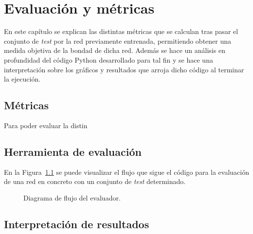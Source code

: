 \chapter{Evaluación y métricas}\label{cap.evaluacion}

En este capítulo se explican las distintas métricas que se calculan tras pasar el conjunto de \textit{test} por la red previamente entrenada, permitiendo obtener una medida objetiva de la bondad de dicha red. Además se hace un análisis en profundidad del código Python desarrollado para tal fin y se hace una interpretación sobre los gráficos y resultados que arroja dicho código al terminar la ejecución.

\section{Métricas}

Para poder evaluar la distin

\section{Herramienta de evaluación}

En la Figura~\ref{fig.flujo_test} se puede visualizar el flujo que sigue el código para la evaluación de una red en concreto con un conjunto de \textit{test} determinado.

\vspace{10pt}
\begin{figure}[H]
    \begin{center}
        \caption{Diagrama de flujo del evaluador.}
	    \label{fig.flujo_test}
	\end{center}
\end{figure}

\section{Interpretación de resultados}